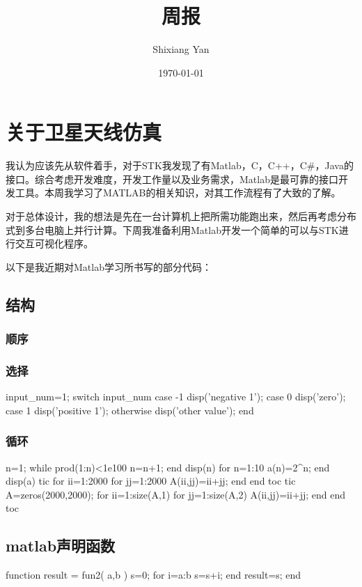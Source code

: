 \documentclass{article}
\title{周报}
\author{Shixiang Yan}
\date{\today}
\begin{document}
	\maketitle
	\tableofcontents
	\section{关于卫星天线仿真}
	我认为应该先从软件着手，对于STK我发现了有Matlab，C，C++，C\#，Java的接口。综合考虑开发难度，开发工作量以及业务需求，Matlab是最可靠的接口开发工具。本周我学习了MATLAB的相关知识，对其工作流程有了大致的了解。
	
	对于总体设计，我的想法是先在一台计算机上把所需功能跑出来，然后再考虑分布式到多台电脑上并行计算。下周我准备利用Matlab开发一个简单的可以与STK进行交互可视化程序。
	
	以下是我近期对Matlab学习所书写的部分代码：
	\subsection{结构}
	\subsubsection{顺序}
	\subsubsection{选择}
	\begin{python}
		input_num=1;
		switch input_num
		case -1
		disp('negative 1');
		case 0
		disp('zero');
		case 1
		disp('positive 1');
		otherwise
		disp('other value');
		end        
	\end{python}
	\subsubsection{循环}
	\begin{python}
		n=1;
		while prod(1:n)<1e100 %
		n=n+1;
		end
		disp(n)
		for n=1:10
		a(n)=2^n;
		end
		disp(a)
		tic
		for ii=1:2000
		for jj=1:2000
		A(ii,jj)=ii+jj;
		end
		end
		toc
		tic
		A=zeros(2000,2000);
		for ii=1:size(A,1)
		for jj=1:size(A,2)
		A(ii,jj)=ii+jj;
		end
		end
		toc
	\end{python}
	\subsection{matlab声明函数}
	\begin{python}
		function result = fun2( a,b )
		s=0;
		for i=a:b
		s=s+i;
		end
		result=s;
		end
	\end{python}
\end{document}
